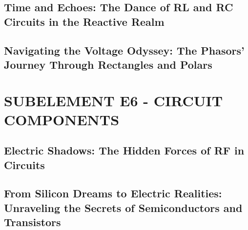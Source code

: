 \documentclass[12pt]{book}
\begin{document}
\section{Time and Echoes: The Dance of RL and RC Circuits in the Reactive Realm}












\section{Navigating the Voltage Odyssey: The Phasors' Journey Through Rectangles and Polars}












\chapter{SUBELEMENT E6 - CIRCUIT COMPONENTS}
\section{Electric Shadows: The Hidden Forces of RF in Circuits}












\section{From Silicon Dreams to Electric Realities: Unraveling the Secrets of Semiconductors and Transistors}












\end{document}
